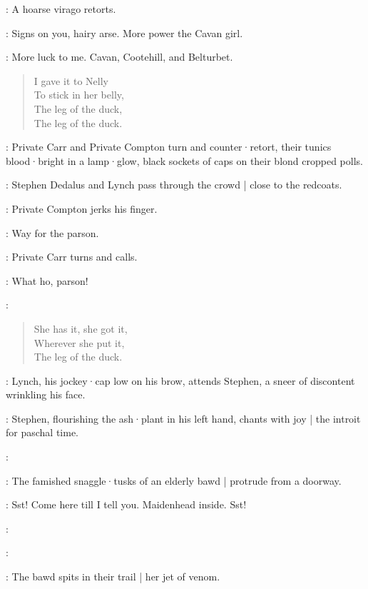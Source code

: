 :
A hoarse virago retorts.

\Virago:
Signs on you,
hairy arse.
More power the Cavan girl.

\Cissy:
More luck to me.
Cavan,
Cootehill,
and Belturbet.

\begin{verse}
    I gave it to Nelly\\
    To stick in her belly,\\
    The leg of the duck,\\
    The leg of the duck.
\end{verse}

:
Private Carr and Private Compton turn and counter·retort,
their tunics blood·bright in a lamp·glow,
black sockets of caps on their blond cropped polls.

:
Stephen Dedalus and Lynch pass through the crowd |
close to the redcoats.

:
Private Compton jerks his finger.

\Compton:
Way for the parson.

:
Private Carr turns and calls.

\Carr:
What ho,
parson!

\Cissy:

\begin{verse}
%
    She has it, she got it,\\
    Wherever she put it,\\
    The leg of the duck.
\end{verse}

:
Lynch,
his jockey·cap low on his brow,
attends Stephen,
a sneer of discontent wrinkling his face.

:
Stephen,
flourishing the ash·plant in his left hand,
chants with joy |
the introit for paschal time.

\Stephen:

:
The famished snaggle·tusks of an elderly bawd |
protrude from a doorway.

\Bawd:
Sst!
Come here till I tell you.
Maidenhead inside.
Sst!

:

\Stephen:

:
The bawd spits in their trail |
her jet of venom.

